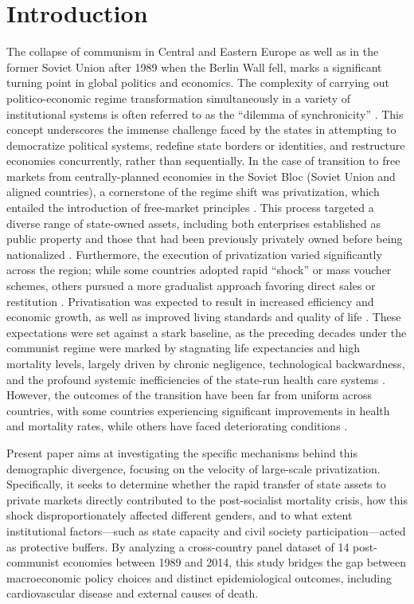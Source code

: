 \documentclass[en,magisterska]{pracamgr}
\begin{document}
\section*{Introduction}
    The collapse of communism in Central and Eastern Europe as well as in the former Soviet Union after 1989 when the Berlin Wall fell, 
marks a significant turning point in global politics and economics. The complexity of carrying out politico-economic regime transformation simultaneously 
in a variety of institutional systems is often referred to as the ``dilemma of synchronicity'' \citep{A_Ramet2010}. This concept underscores 
the immense challenge faced by the states in attempting to democratize political systems, redefine state borders or identities, 
and restructure economies concurrently, rather than sequentially. In the case of transition to free markets from centrally-planned economies in the Soviet Bloc (Soviet Union and aligned countries), a cornerstone of the regime shift was privatization, 
which entailed the introduction of free-market principles \citep{Estrin2004}. This process targeted a diverse range 
of state-owned assets, including both enterprises established as public property and those that had been previously privately owned before being 
nationalized \citep{A_Ramet2010}. Furthermore, the execution of privatization varied significantly across the region; while some countries 
adopted rapid ``shock'' or mass voucher schemes, others pursued a more gradualist approach favoring direct sales or restitution 
\citep{Soos1997, Rohac2016}. Privatisation was expected to result in increased efficiency and economic growth, as well as improved living standards and quality of life 
\citep{Cornia2016}. These expectations were set against a stark baseline, as the preceding decades under the communist regime were marked by stagnating life expectancies 
and high mortality levels, largely driven by chronic negligence, technological backwardness, and the profound systemic inefficiencies of the state-run health care 
systems \citep{Eberstadt1981, Feshbach1992, MesleVallin2002}. However, the outcomes of the transition have been far from uniform across countries, with some countries 
experiencing significant improvements in health and mortality rates, while others have faced deteriorating conditions \citep{B_Brainerd1998}.

Present paper aims at investigating the specific mechanisms behind this demographic divergence, focusing on the velocity of large-scale privatization. 
Specifically, it seeks to determine whether the rapid transfer of state assets to private markets directly contributed to the post-socialist mortality crisis, 
how this shock disproportionately affected different genders, and to what extent institutional factors—such as state capacity and civil society participation—acted 
as protective buffers. By analyzing a cross-country panel dataset of 14 post-communist economies between 1989 and 2014, this study bridges the gap between 
macroeconomic policy choices and distinct epidemiological outcomes, including cardiovascular disease and external causes of death. 
\end{document}

